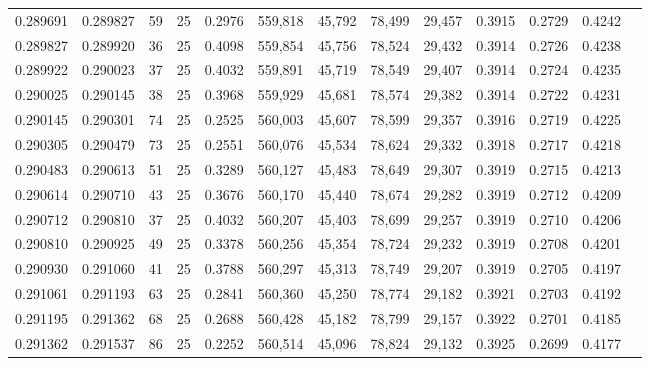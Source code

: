\begin{tabular}{rrrrrrrrrrrrr}
0.289691 & 0.289827 &    59 &  25 &                                     0.2976 & 559,818 &  45,792 &  78,499 &  29,457 & 0.3915 & 0.2729 & 0.4242 \\
0.289827 & 0.289920 &    36 &  25 &                                     0.4098 & 559,854 &  45,756 &  78,524 &  29,432 & 0.3914 & 0.2726 & 0.4238 \\
0.289922 & 0.290023 &    37 &  25 &                                     0.4032 & 559,891 &  45,719 &  78,549 &  29,407 & 0.3914 & 0.2724 & 0.4235 \\
0.290025 & 0.290145 &    38 &  25 &                                     0.3968 & 559,929 &  45,681 &  78,574 &  29,382 & 0.3914 & 0.2722 & 0.4231 \\
0.290145 & 0.290301 &    74 &  25 &                                     0.2525 & 560,003 &  45,607 &  78,599 &  29,357 & 0.3916 & 0.2719 & 0.4225 \\
0.290305 & 0.290479 &    73 &  25 &                                     0.2551 & 560,076 &  45,534 &  78,624 &  29,332 & 0.3918 & 0.2717 & 0.4218 \\
0.290483 & 0.290613 &    51 &  25 &                                     0.3289 & 560,127 &  45,483 &  78,649 &  29,307 & 0.3919 & 0.2715 & 0.4213 \\
0.290614 & 0.290710 &    43 &  25 &                                     0.3676 & 560,170 &  45,440 &  78,674 &  29,282 & 0.3919 & 0.2712 & 0.4209 \\
0.290712 & 0.290810 &    37 &  25 &                                     0.4032 & 560,207 &  45,403 &  78,699 &  29,257 & 0.3919 & 0.2710 & 0.4206 \\
0.290810 & 0.290925 &    49 &  25 &                                     0.3378 & 560,256 &  45,354 &  78,724 &  29,232 & 0.3919 & 0.2708 & 0.4201 \\
0.290930 & 0.291060 &    41 &  25 &                                     0.3788 & 560,297 &  45,313 &  78,749 &  29,207 & 0.3919 & 0.2705 & 0.4197 \\
0.291061 & 0.291193 &    63 &  25 &                                     0.2841 & 560,360 &  45,250 &  78,774 &  29,182 & 0.3921 & 0.2703 & 0.4192 \\
0.291195 & 0.291362 &    68 &  25 &                                     0.2688 & 560,428 &  45,182 &  78,799 &  29,157 & 0.3922 & 0.2701 & 0.4185 \\
0.291362 & 0.291537 &    86 &  25 &                                     0.2252 & 560,514 &  45,096 &  78,824 &  29,132 & 0.3925 & 0.2699 & 0.4177 \\

\end{tabular}
